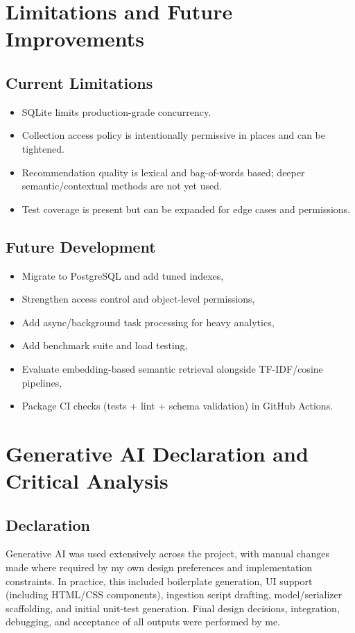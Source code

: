 \documentclass[11pt,a4paper]{article}
\begin{document}
\section{Limitations and Future Improvements}
\subsection{Current Limitations}
\begin{itemize}[leftmargin=*]
	\item SQLite limits production-grade concurrency.
	\item Collection access policy is intentionally permissive in places and can be tightened.
	\item Recommendation quality is lexical and bag-of-words based; deeper semantic/contextual methods are not yet used.
	\item Test coverage is present but can be expanded for edge cases and permissions.
\end{itemize}

\subsection{Future Development}
\begin{itemize}[leftmargin=*]
	\item Migrate to PostgreSQL and add tuned indexes,
	\item Strengthen access control and object-level permissions,
	\item Add async/background task processing for heavy analytics,
	\item Add benchmark suite and load testing,
	\item Evaluate embedding-based semantic retrieval alongside TF-IDF/cosine pipelines,
	\item Package CI checks (tests + lint + schema validation) in GitHub Actions.
\end{itemize}

\section{Generative AI Declaration and Critical Analysis}
\subsection*{Declaration}
Generative AI was used extensively across the project, with manual changes made where required by my own design preferences and implementation constraints. In practice, this included boilerplate generation, UI support (including HTML/CSS components), ingestion script drafting, model/serializer scaffolding, and initial unit-test generation. Final design decisions, integration, debugging, and acceptance of all outputs were performed by me.
\end{document}
